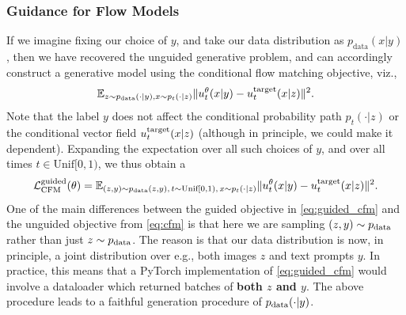 \subsubsection{Guidance for Flow Models}
If we imagine fixing our choice of $y$, and take our data distribution as $p_{\text{data}}(x|y)$, then we have recovered the unguided generative problem, and can accordingly construct a generative model using the conditional flow matching objective, viz.,
\begin{equation}
    \mathbb{E}_{z \sim p_{\text{data}}(\cdot|y), x \sim p_t(\cdot|z)} \lVert u_t^{\theta}(x|y) - u^{\text{target}}_t(x|z)\rVert^2.
\end{equation}
Note that the label $y$ does not affect the conditional probability path $p_t(\cdot|z)$ or the conditional vector field $u^{\text{target}}_t(x|z)$ (although in principle, we could make it dependent). %
Expanding the expectation over all such choices of $y$, and over all times $t \in \text{Unif}[0,1)$, we thus obtain a 
\begin{equation}
    \label{eq:guided_cfm}
    \mathcal{L}_{\text{CFM}}^{\text{guided}}(\theta) = \mathbb{E}_{(z,y) \sim p_{\text{data}}(z,y),\,t\sim \text{Unif}[0,1),\,x\sim p_t(\cdot|z)} \lVert u_t^{\theta}(x|y) - u^{\text{target}}_t(x|z)\rVert^2.
\end{equation}
One of the main differences between the guided objective in \cref{eq:guided_cfm} and the unguided objective from \cref{eq:cfm} is that here we are sampling $(z,y) \sim p_{\rm{data}}$ rather than just $z \sim p_{\rm{data}}$. The reason is that our data distribution is now, in principle, a joint distribution over e.g., both images $z$ and text prompts $y$. In practice, this means that a PyTorch implementation of \cref{eq:guided_cfm} would involve a dataloader which returned batches of \textbf{both $z$ and $y$}. The above procedure leads to a faithful generation procedure of $p_{\rm{data}}(\cdot|y)$.


